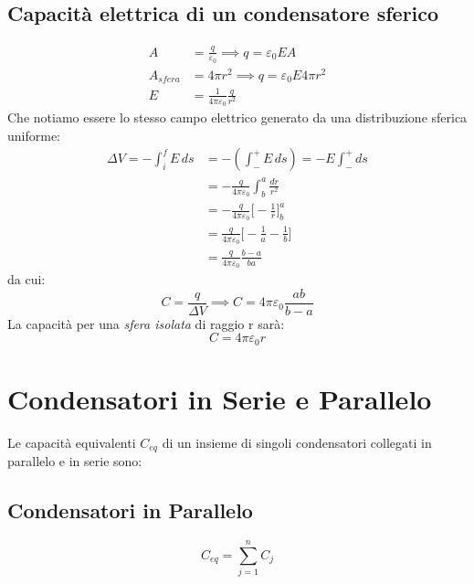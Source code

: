         \subsection{Capacità elettrica di un condensatore sferico}
            \begin{align*}
                A &= \frac{q}{\varepsilon_0} \implies q = \varepsilon_0 E A \\
                A_{sfera} &= 4\pi r^2 \implies q = \varepsilon_0E4\pi r^2 \\
                E &= \frac{1}{4\pi\varepsilon_0}\frac{q}{r^2}
            \end{align*}
        Che notiamo essere lo stesso campo elettrico generato da una 
        distribuzione sferica uniforme:
            \begin{align*}
                \Delta V = - \int_{i}^{f} E\,ds &= -(\int_{-}^{+} E\,ds)
                    = -E\int_{-}^{+}ds \\
                &= -\frac{q}{4\pi\varepsilon_0}\int_{b}^{a}\frac{dr}{r^2} \\
                &= -\frac{q}{4\pi\varepsilon_0} \Bigg[-\frac{1}{r}\Bigg]_{b}
                    ^{a} \\
                &= \frac{q}{4\pi\varepsilon_0} \Bigg[-\frac{1}{a} - \frac{1}{b}
                    \Bigg] \\
                &=  \frac{q}{4\pi\varepsilon_0} \frac{b-a}{ba}
            \end{align*}
        da cui:
            \begin{equation}
                C = \frac{q}{\Delta V} \implies C = 4\pi\varepsilon_0
                    \frac{ab}{b-a}
            \end{equation}
        La capacità per una \textit{sfera isolata} di raggio r sarà:
            \begin{equation}
                C = 4\pi\varepsilon_0r
            \end{equation}
    
    \section{Condensatori in Serie e Parallelo} Le capacità equivalenti $C_{eq}
    $ di un insieme di singoli condensatori collegati in parallelo e in serie 
    sono:

        \subsection{Condensatori in Parallelo}
            \begin{equation}
                C_{eq} = \sum_{j = 1}^{n} C_j
            \end{equation}

